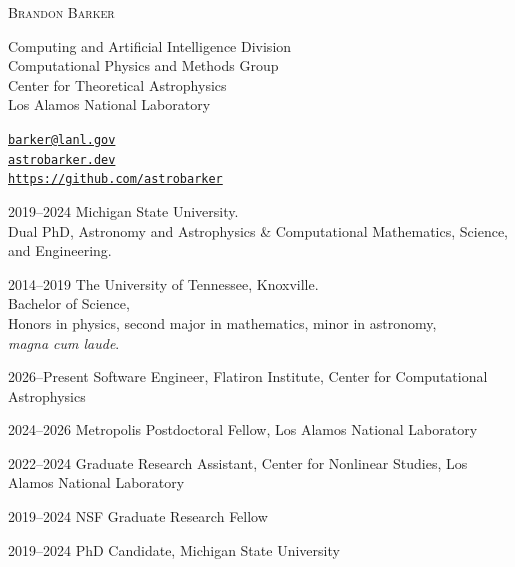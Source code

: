 \documentclass[11pt]{vitae}
\begin{document}
\thispagestyle{empty}
{\LARGE\scshape Brandon Barker}

\parbox[t]{186pt}{%
Computing and Artificial Intelligence Division\\
Computational Physics and Methods Group\\
Center for Theoretical Astrophysics\\
Los Alamos National Laboratory\\
}
\hfill
\parbox[t]{220pt}{%
\href{mailto:barker@lanl.gov}{\texttt{barker@lanl.gov}}\\
\href{astrobarker.dev}{\texttt{astrobarker.dev}}\\
\href{https://github.com/astrobarker}{\texttt{https://github.com/astrobarker}}\\
}

\vspace{4.0ex plus1ex minus0.5ex}

\begin{chronlist}
\item[2019--2024] Michigan State University. \\ 
        Dual PhD, Astronomy and Astrophysics \& 
 Computational Mathematics, Science, and Engineering.

\item[2014--2019] The University of Tennessee, Knoxville.  \\
  Bachelor of Science, \\
  Honors in physics, second major in mathematics,
  minor in astronomy, \\ \emph{magna cum laude}.

\end{chronlist}

\begin{chronlist}
\item[2026--Present] Software Engineer, Flatiron Institute, Center for Computational Astrophysics
\item[2024--2026] Metropolis Postdoctoral Fellow, Los Alamos National Laboratory
\item[2022--2024] Graduate Research Assistant, Center for Nonlinear Studies, Los Alamos National Laboratory
\item[2019--2024] NSF Graduate Research Fellow
\item[2019--2024] PhD Candidate, Michigan State University
\end{chronlist}

\end{document}
